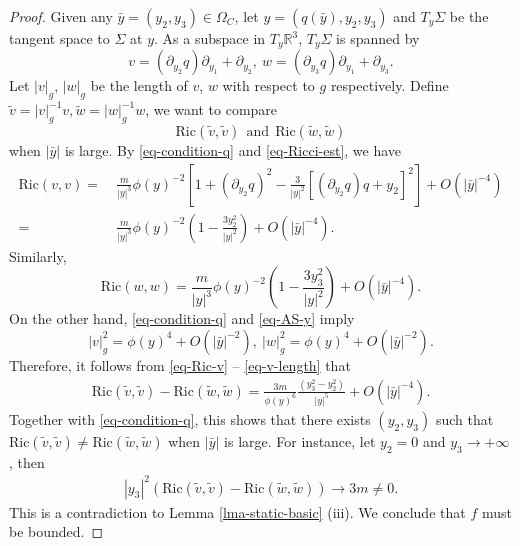 \documentclass[12pt]{amsart}
\theoremstyle{remark}
\numberwithin{equation}{section}
\newcommand{\Ric}{\mbox{Ric}}
\newcommand{\R}{\mathbb R}
\newcommand{\be}{\begin{equation}}
\newcommand{\ee}{\end{equation}}
\def\p{\partial}
\def\lf{\left}
\def\ri{\right}
\begin{document}
\begin{proof}
Given any $ \bar{y} = (y_2, y_3) \in \Omega_C$,  let  $y =  (q(\bar{y}), y_2, y_3)$ and
$ T_{ {y}} \Sigma  $  be the tangent space to $ \Sigma$ at $y$.
As a subspace in $ T_y \R^3$, $ T_{{y}} \Sigma  $ is spanned by
$$ v  =  (\p_{ y_2} q)  \p_{ y_1}  + \p_{ y_2} , \ w  =  (\p_{ y_3} q)  \p_{ y_1}  + \p_{ y_3}  .$$
Let $ | v|_g$, $| w|_g$ be the length of $v$, $w$  with respect to $g$   respectively.
Define  $ \tilde{v} = | v|_g^{-1} v,  \tilde{w} = | w|_g^{-1} w $,
we want to   compare
$$  \Ric (\tilde{v}, \tilde{v} ) \ \ \mathrm{and} \ \
\Ric( \tilde{w}, \tilde{w} )$$
when  $ | \bar{y} | $ is large.
By \eqref{eq-condition-q} and \eqref{eq-Ricci-est},  we have
\be \label{eq-Ric-v}
\begin{split}
 \Ric (v, v)
=  & \
 \frac{m}{ |y|^3} \phi (y)^{-2}  \lf[ 1 +  (\p_{ y_2} q)^2  - \frac{3}{|y|^2}  \lf[   (\p_{y_2} q) q +  y_2 \ri]^2    \ri] +  O ( |\bar{y}|^{-4} ) \\
  = & \  \frac{m}{ |y|^3}    \phi(y)^{-2} \lf( 1  - \frac{3 y_2^2 }{ |  y |^2 }   \ri) +  O ( |\bar{y}|^{-4} ) .
\end{split}
\ee
Similarly,
\be
\Ric (w, w)  =  \frac{m}{ |y|^3}   \phi(y)^{-2}     \lf( 1  - \frac{3 y_3^2 }{ |  y |^2 }   \ri) +  O ( |\bar{y}|^{-4} ).
 \ee
On the other hand, \eqref{eq-condition-q} and \eqref{eq-AS-y} imply
\be \label{eq-v-length}
| v |^2_g =  \phi(y)^4 + O ( | \bar y |^{-2 } ) , \
| w |^2_g =  \phi(y)^4 + O ( | \bar y |^{-2 } )  .
\ee
Therefore, it follows from \eqref{eq-Ric-v} -- \eqref{eq-v-length} that
\be \label{eq-differ-Ric}
\begin{split}
\Ric (\tilde{v}, \tilde{v})  - \Ric (\tilde{w} , \tilde{w} )
=  \frac{3 m }{\phi (y)^{6} }   \frac{  \lf(   y_3^2 -   y_2^2  \ri)   }{ | y |^5  } +  O ( |\bar{y}|^{-4 } ).
\end{split}
\ee
Together with \eqref{eq-condition-q},  this shows that there exists $ (y_2, y_3) $ such that
$ \Ric ( \tilde{v}, \tilde{v} )  \neq \Ric ( \tilde{w}, \tilde{w})$  when  $ | \bar y| $ is large.
For instance, let $y_2 = 0 $ and $ y_3 \rightarrow + \infty$, then
\be
\begin{split}
 | y_3 |^2 ( \Ric (\tilde{v}, \tilde{v})  - \Ric (\tilde{w} , \tilde{w} ) ) \longrightarrow 3 m \neq 0 .
\end{split}
\ee
This  is a contradiction to  Lemma \ref{lma-static-basic} (iii).
We conclude that $f$ must be bounded.
\end{proof}
\end{document}
